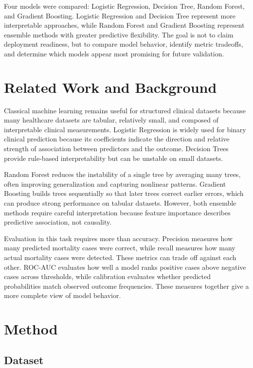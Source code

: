 \documentclass{article}
\begin{document}
Four models were compared: Logistic Regression, Decision Tree, Random Forest, and Gradient Boosting. Logistic Regression and Decision Tree represent more interpretable approaches, while Random Forest and Gradient Boosting represent ensemble methods with greater predictive flexibility. The goal is not to claim deployment readiness, but to compare model behavior, identify metric tradeoffs, and determine which models appear most promising for future validation.

\section{Related Work and Background}

Classical machine learning remains useful for structured clinical datasets because many healthcare datasets are tabular, relatively small, and composed of interpretable clinical measurements. Logistic Regression is widely used for binary clinical prediction because its coefficients indicate the direction and relative strength of association between predictors and the outcome. Decision Trees provide rule-based interpretability but can be unstable on small datasets.

Random Forest reduces the instability of a single tree by averaging many trees, often improving generalization and capturing nonlinear patterns. Gradient Boosting builds trees sequentially so that later trees correct earlier errors, which can produce strong performance on tabular datasets. However, both ensemble methods require careful interpretation because feature importance describes predictive association, not causality.

Evaluation in this task requires more than accuracy. Precision measures how many predicted mortality cases were correct, while recall measures how many actual mortality cases were detected. These metrics can trade off against each other. ROC-AUC evaluates how well a model ranks positive cases above negative cases across thresholds, while calibration evaluates whether predicted probabilities match observed outcome frequencies. These measures together give a more complete view of model behavior.

\section{Method}

\subsection{Dataset}
\end{document}
